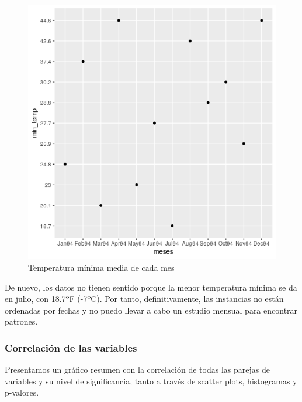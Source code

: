 \begin{figure}[H] %
	\centering
	\includegraphics[scale=0.7]{div2.png}  %
	\caption{Temperatura mínima media de cada mes} 
	\label{fig:div2}
\end{figure}

De nuevo, los datos no tienen sentido porque la menor temperatura mínima se da en julio, con 18.7ºF (-7ºC). Por tanto, definitivamente, las instancias no están ordenadas por fechas y no puedo llevar a cabo un estudio mensual para encontrar patrones.

\newpage 
\subsubsection{Correlación de las variables}

Presentamos un gráfico resumen con la correlación de todas las parejas de variables y su nivel de significancia, tanto a través de scatter plots, histogramas y p-valores.


